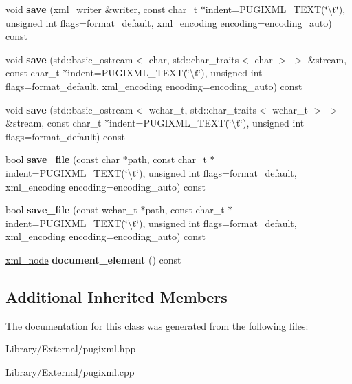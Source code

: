 \begin{DoxyCompactItemize}
\item 
\hypertarget{classpugi_1_1xml__document_ae69983f0991300cc9afc8891ff9ca4ac}{}void {\bfseries save} (\hyperlink{classpugi_1_1xml__writer}{xml\+\_\+writer} \&writer, const char\+\_\+t $\ast$indent=P\+U\+G\+I\+X\+M\+L\+\_\+\+T\+E\+X\+T(\char`\"{}\textbackslash{}t\char`\"{}), unsigned int flags=format\+\_\+default, xml\+\_\+encoding encoding=encoding\+\_\+auto) const \label{classpugi_1_1xml__document_ae69983f0991300cc9afc8891ff9ca4ac}

\item 
\hypertarget{classpugi_1_1xml__document_a471d7354af62da143f10943057c99ffa}{}void {\bfseries save} (std\+::basic\+\_\+ostream$<$ char, std\+::char\+\_\+traits$<$ char $>$ $>$ \&stream, const char\+\_\+t $\ast$indent=P\+U\+G\+I\+X\+M\+L\+\_\+\+T\+E\+X\+T(\char`\"{}\textbackslash{}t\char`\"{}), unsigned int flags=format\+\_\+default, xml\+\_\+encoding encoding=encoding\+\_\+auto) const \label{classpugi_1_1xml__document_a471d7354af62da143f10943057c99ffa}

\item 
\hypertarget{classpugi_1_1xml__document_ae0b377bda28c7fbac4ba50b4e3f9d211}{}void {\bfseries save} (std\+::basic\+\_\+ostream$<$ wchar\+\_\+t, std\+::char\+\_\+traits$<$ wchar\+\_\+t $>$ $>$ \&stream, const char\+\_\+t $\ast$indent=P\+U\+G\+I\+X\+M\+L\+\_\+\+T\+E\+X\+T(\char`\"{}\textbackslash{}t\char`\"{}), unsigned int flags=format\+\_\+default) const \label{classpugi_1_1xml__document_ae0b377bda28c7fbac4ba50b4e3f9d211}

\item 
\hypertarget{classpugi_1_1xml__document_ac67294573cbaa41d3e6210480a9f7f99}{}bool {\bfseries save\+\_\+file} (const char $\ast$path, const char\+\_\+t $\ast$indent=P\+U\+G\+I\+X\+M\+L\+\_\+\+T\+E\+X\+T(\char`\"{}\textbackslash{}t\char`\"{}), unsigned int flags=format\+\_\+default, xml\+\_\+encoding encoding=encoding\+\_\+auto) const \label{classpugi_1_1xml__document_ac67294573cbaa41d3e6210480a9f7f99}

\item 
\hypertarget{classpugi_1_1xml__document_a47e18cd3438eabd64fa2f82d56b08aef}{}bool {\bfseries save\+\_\+file} (const wchar\+\_\+t $\ast$path, const char\+\_\+t $\ast$indent=P\+U\+G\+I\+X\+M\+L\+\_\+\+T\+E\+X\+T(\char`\"{}\textbackslash{}t\char`\"{}), unsigned int flags=format\+\_\+default, xml\+\_\+encoding encoding=encoding\+\_\+auto) const \label{classpugi_1_1xml__document_a47e18cd3438eabd64fa2f82d56b08aef}

\item 
\hypertarget{classpugi_1_1xml__document_aa3b17a8891e2c89996ab4c7a2a6759ad}{}\hyperlink{classpugi_1_1xml__node}{xml\+\_\+node} {\bfseries document\+\_\+element} () const \label{classpugi_1_1xml__document_aa3b17a8891e2c89996ab4c7a2a6759ad}

\end{DoxyCompactItemize}
\subsection*{Additional Inherited Members}


The documentation for this class was generated from the following files\+:\begin{DoxyCompactItemize}
\item 
Library/\+External/pugixml.\+hpp\item 
Library/\+External/pugixml.\+cpp\end{DoxyCompactItemize}
